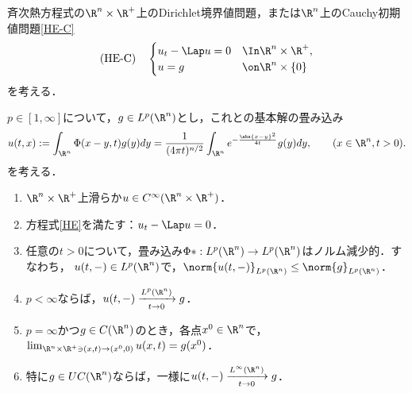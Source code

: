 \documentclass[uplatex,dvipdfmx]{jsreport}
\begin{document}
\begin{problem*}
    斉次熱方程式の$\R^n\times\R^+$上のDirichlet境界値問題，または$\R^n$上のCauchy初期値問題\ref{HE-C}
    \[\text{(HE-C)}\quad\begin{cases}
        u_t-\Lap u=0&\In\R^n\times\R^+,\\
        u=g&\on\R^n\times\{0\}
    \end{cases}\]
    を考える．
\end{problem*}

\begin{theorem}\label{thm-solution-for-HHE}
    $p\in[1,\infty]$について，$g\in L^p(\R^n)$とし，これとの基本解の畳み込み
    \[u(t,x):=\int_{\R^n}\Phi(x-y,t)g(y)dy=\frac{1}{(4\pi t)^{n/2}}\int_{\R^n}e^{-\frac{\abs{x-y}^2}{4t}}g(y)dy,\qquad(x\in\R^n,t>0).\]
    を考える．
    \begin{enumerate}
        \item $\R^n\times\R^+$上滑らか$u\in C^\infty(\R^n\times\R^+)$．
        \item 方程式\ref{HE}を満たす：$u_t-\Lap u=0$．
        \item 任意の$t>0$について，畳み込み$\Phi*:L^p(\R^n)\to L^p(\R^n)$はノルム減少的．すなわち，
        $u(t,-)\in L^p(\R^n)$で，$\norm{u(t,-)}_{L^p(\R^n)}\le\norm{g}_{L^p(\R^n)}$．
        \item $p<\infty$ならば，$u(t,-)\xrightarrow[t\to0]{L^p(\R^n)}g$．
        \item $p=\infty$かつ$g\in C(\R^n)$のとき，各点$x^0\in\R^n$で，$\lim_{\R^n\times\R^+\ni(x,t)\to(x^0,0)}u(x,t)=g(x^0)$．
        \item 特に$g\in UC(\R^n)$ならば，一様に$u(t,-)\xrightarrow[t\to0]{L^\infty(\R^n)}g$．
    \end{enumerate}
\end{theorem}
\end{document}
